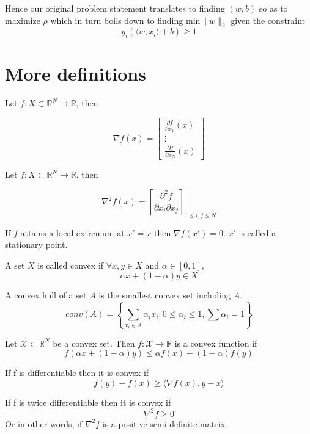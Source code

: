 \documentclass[a4paper,english,12pt]{article}
\begin{document}
Hence our original problem statement translates to finding $(w,b)$ so as to maximize $\rho$ which in turn boils down to finding $\mathrm{min} \|w\|_2$ given the constraint
$$ y_i \left(\langle w,x_i \rangle + b \right) \geq 1 $$

\section{More definitions}

\begin{defn}[Gradient]

Let $f:X\subset\mathbb{R}^N\rightarrow\mathbb{R}$, then

$$ \nabla f(x) = \left[  \begin{array}{ccc} \frac{\partial f}{\partial x_1} (x) \\ \vdots \\ \frac{\partial f}{\partial x_N} (x)
\end{array}  \right] $$

\end{defn}

\begin{defn}[Hessian]

Let $f:X\subset\mathbb{R}^N\rightarrow\mathbb{R}$, then

$$ \nabla ^2 f(x) = \left[  \frac{\partial ^2 f}{\partial x_i \partial x_j}  \right]_{1 \leq i, j \leq N} $$

\end{defn}

\begin{defn}
If $f$ attains a local extremum at $x' = x$ then $\nabla f(x') = 0$. $x'$ is called a stationary point.
\end{defn}

\begin{defn}
A set $X$ is called convex if $\forall x,y \in X$ and $\alpha \in [0,1]$,
$$ \alpha x + (1-\alpha) y \in X $$
\end{defn}

\begin{defn}
A convex hull of a set $A$ is the smallest convex set including $A$.
$$ conv(A) = \left\{ \sum_{x_i \in A} \alpha _i x_i : 0 \leq \alpha _i \leq 1 , \sum \alpha _i = 1 \right\} $$
\end{defn}

\begin{defn}
Let $\mathcal{X} \subset \mathbb{R}^N$ be a convex set. Then $f: \mathcal{X}\rightarrow\mathbb{R}$ is a convex function if
$$ f\left( \alpha x + (1-\alpha)y \right) \leq \alpha f(x) + (1-\alpha) f(y) $$

If f is differentiable then it is convex if
$$ f(y) - f(x) \geq \langle \nabla f(x), {y-x} \rangle $$

If f is twice differentiable then it is convex if
$$ \nabla ^2 f \geq 0 $$
Or in other words, if $\nabla ^2 f$ is a positive semi-definite matrix.
\end{defn}
\end{document}
